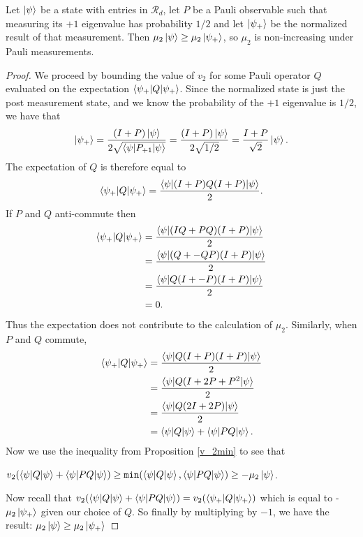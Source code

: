 \documentclass[12pt]{dalthesis}
\begin{document}
\begin{proposition}
\label{dyadic is monotone}
Let $\ket{\psi}$ be a state with entries in $\mathcal{R}_d$, let $P$ be a Pauli observable such that measuring its $+1$ eigenvalue has probability $1/2$ and let $\ket{\psi_+}$ be the normalized result of that measurement. Then $\mu_2\ket{\psi} \geq \mu_2\ket{\psi_+}$, so $\mu_2$ is non-increasing under Pauli measurements. 
\end{proposition}
\begin{proof}
We proceed by bounding the value of $v_2$ for some Pauli operator $Q$ evaluated on the expectation $\braket{\psi_+ | Q |\psi_+}$. Since the normalized state is just the post measurement state, and we know the probability of the $+1$ eigenvalue is $1/2$, we have that 
\[
\ket{\psi_+} = \frac{(I+P) \ket{\psi}}{2 \sqrt{\braket{\psi | P_{+1} | \psi}}} = \frac{(I+P) \ket{\psi}}{2 \sqrt{1/2}} = \frac{I + P}{\sqrt{2}}\ket{\psi}.
\]
The expectation of $Q$ is therefore equal to
\begin{equation*}
\braket{\psi_+ | Q |\psi_+} = \frac{\braket{\psi | (I + P)Q(I + P) | \psi}}{2}.
\end{equation*}
If $P$ and $Q$ anti-commute then 
\begin{align*}
\braket{\psi_+ | Q |\psi_+} & = \frac{\braket{\psi | (IQ + PQ)(I + P) | \psi}}{2} \\
& = \frac{\braket{\psi | (Q + -QP)(I + P) | \psi}}{2} \\
& = \frac{\braket{\psi | Q(I + -P)(I + P) | \psi}}{2} \\
& = 0.
\end{align*}
Thus the expectation does not contribute to the calculation of $\mu_2$. Similarly, when $P$ and $Q$ commute, 
\begin{align*}
\braket{\psi_+ | Q |\psi_+} & = \frac{\braket{\psi | Q(I + P)(I + P) | \psi}}{2} \\
& = \frac{\braket{\psi | Q(I + 2P + P^2 | \psi}}{2} \\
& = \frac{\braket{\psi | Q(2I+2P) | \psi}}{2} \\
& = \braket{\psi | Q | \psi} + \braket{\psi |PQ |\psi}.
\end{align*}
Now we use the inequality from Proposition \ref{v_2min} to see that
\begin{center}
$v_2(\braket{\psi |Q| \psi} + \braket{\psi |PQ| \psi}) \geq \texttt{min}(\braket{\psi |Q|\psi}, \braket{\psi |PQ|\psi}) \geq -\mu_2\ket{\psi}$.
\end{center}
Now recall that $v_2(\braket{\psi |Q| \psi} + \braket{\psi |PQ| \psi}) = v_2(\braket{\psi_+ |Q| \psi_+})$ which is equal to -$\mu_2\ket{\psi_+}$ given our choice of $Q$. So finally by multiplying by $-1$, we have the result: $\mu_2\ket{\psi} \geq \mu_2\ket{\psi_+}$
\end{proof}
\end{document}
